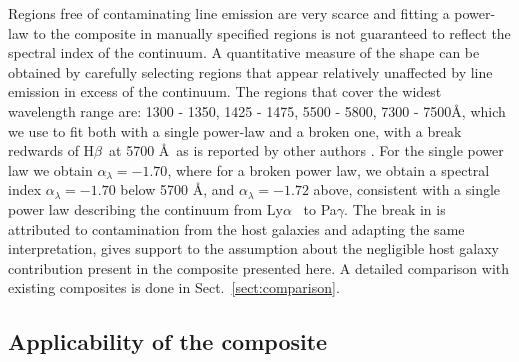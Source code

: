 \documentclass{aa}    %
\newcommand{\sectionname}{Sect.}
\newcommand{\Sect}[1]{\sectionname~\ref{sect:#1}}
\newcommand{\sect}[1]{\Sect{#1}}
\newcommand{\sectlabel}[1]{\label{sect:#1}}
\newcommand{\lya}{Ly$\alpha$}
\newcommand{\hb}{H$\beta$}
\begin{document}
Regions free of contaminating line emission are very scarce and fitting a
power-law to the composite in manually specified regions is not guaranteed to
reflect the spectral index of the continuum. A quantitative measure of the shape
can be obtained by carefully selecting regions that appear relatively unaffected
by line emission in excess of the continuum. The regions that cover the widest
wavelength range are: 1300 - 1350, 1425 - 1475, 5500 - 5800, 7300 - 7500\AA,
which we use to fit both with a single power-law and a broken one, with a
break redwards of \hb~at 5700 \AA~as is reported by other authors
\citep[e.g.,][]{VandenBerk2001}. For the single power law we obtain
$\alpha_\lambda = -1.70$, where for a broken power law, we obtain a spectral
index $\alpha_\lambda = -1.70$ below 5700 \AA, and $\alpha_\lambda = -1.72$
above, consistent with a single power law describing the continuum from  \lya
~to Pa$\gamma$. The break in \cite{VandenBerk2001} is attributed to
contamination from the host galaxies \citep{Glikman2006} and adapting the same
interpretation, gives support to the assumption about the negligible host galaxy
contribution present in the composite presented here. A detailed comparison with
existing composites is done in \sect{comparison}.


\subsection{Applicability of the composite}  \sectlabel{application}
\end{document}
